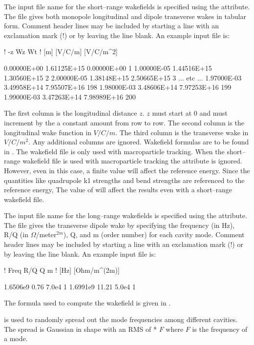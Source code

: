 {{
The input file name for the short--range wakefields is specified using
the  attribute. The file gives both monopole
longitudinal and dipole transverse wakes in tabular form. Comment
header lines may be included by starting a line with an exclamation
mark (!) or by leaving the line blank.  An example input file is:
\begin{example}
  !  -z             Wz             Wt
  !  [m]        [V/C/m]       [V/C/m^2]

  0.00000E+00  1.61125E+15   0.00000E+00     1 
  1.00000E-05  1.44516E+15   1.30560E+15     2 
  2.00000E-05  1.38148E+15   2.50665E+15     3 
  ... etc ...
  1.97000E-03  3.49958E+14   7.95507E+16   198 
  1.98000E-03  3.48606E+14   7.97253E+16   199  
  1.99000E-03  3.47263E+14   7.98989E+16   200 
\end{example}
The first column is the longitudinal distance $z$. $z$ must start at 0
and must increment by the a constant amount from row to row. The
second column is the longitudinal wake function in $V/C/m$. The third
column is the transverse wake in $V/C/m^2$. Any additional columns are
ignored.  Wakefield formulas are to be found in . 
The wakefield file is only used with macroparticle tracking. 
When the short--range wakefield file is used with macroparticle tracking 
the  attribute is ignored. However, even in this case, a finite
 value will affect the reference energy. Since the quantities
like quadrupole k1 strengths and bend strengths are referenced to the 
reference energy, The value of  will affect the results even with
a short--range wakefield file.

The input file name for the long--range wakefields is specified using
the  attribute. The file gives the transverse dipole
wake by specifying the frequency (in Hz), R/Q (in
$\Omega$/meter$^{2m}$), Q, and m (order number) for each cavity mode.
Comment header lines may be included by starting a line with an
exclamation mark (!) or by leaving the line blank.  An example input
file is:
\begin{example}
  ! Freq       R/Q      Q       m
  ! [Hz]  [Ohm/m^(2m)]

  1.6506e9    0.76    7.0e4     1
  1.6991e9   11.21    5.0e4     1
\end{example}
The formula used to compute the wakefield is given in
. 

 is used to randomly spread out the mode frequencies
among different cavities. The spread is Gaussian in shape with an RMS
of  * $F$ where $F$ is the frequency of a mode.

}}
